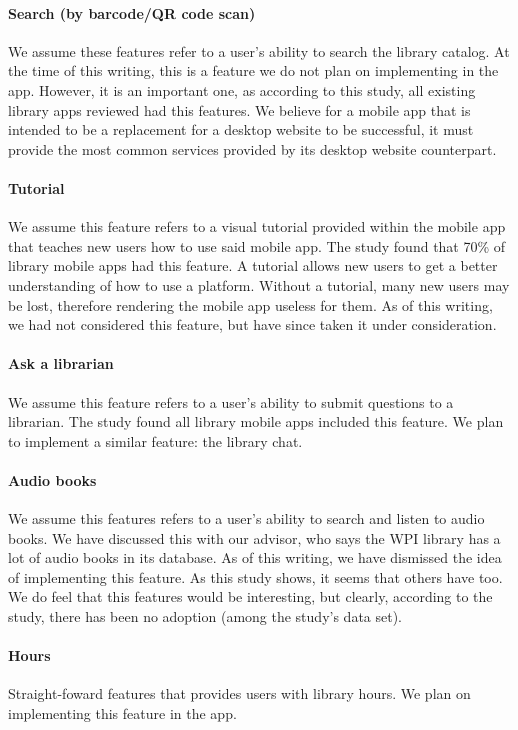     \paragraph{Search (by barcode/QR code scan)}
    We assume these features refer to a user's ability to search the library catalog. At the time of this writing, this is a feature we do not plan on implementing in the \appname app. However, it is an important one, as according to this study, all existing library apps reviewed had this features. We believe for a mobile app that is intended to be a replacement for a desktop website to be successful, it must provide the most common services provided by its desktop website counterpart.
    \paragraph{Tutorial}
    We assume this feature refers to a visual tutorial provided within the mobile app that teaches new users how to use said mobile app. The study found that 70\% of library mobile apps had this feature. A tutorial allows new users to get a better understanding of how to use a platform. Without a tutorial, many new users may be lost, therefore rendering the mobile app useless for them. As of this writing, we had not considered this feature, but have since taken it under consideration.
    \paragraph{Ask a librarian}
    We assume this feature refers to a user's ability to submit questions to a librarian. The study found all library mobile apps included this feature. We plan to implement a similar feature: the library chat.
    \paragraph{Audio books}
    We assume this features refers to a user's ability to search and listen to audio books. We have discussed this with our advisor, who says the WPI library has a lot of audio books in its database. As of this writing, we have dismissed the idea of implementing this feature. As this study shows, it seems that others have too. We do feel that this features would be interesting, but clearly, according to the study, there has been no adoption (among the study's data set).
    \paragraph{Hours}
    Straight-foward features that provides users with library hours. We plan on implementing this feature in the \appname app.

